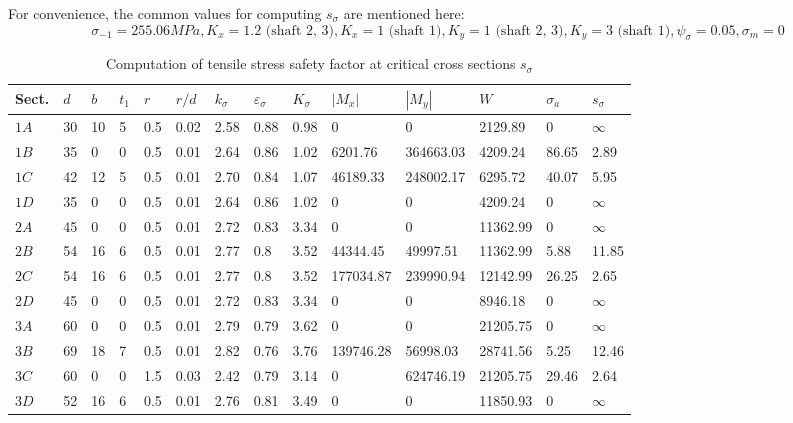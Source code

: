 \begin{landscape}
	For convenience, the common values for computing $ s_\sigma $ are mentioned here:
	\[
	\sigma_{-1} = 255.06 \unit{MPa}, K_x = 1.2 \text{ (shaft 2, 3)}, K_x = 1 \text{ (shaft 1)}, K_y = 1 \text{ (shaft 2, 3)}, K_y = 3 \text{ (shaft 1)}, \psi_\sigma = 0.05, \sigma_m = 0
	\]
	\begin{table}[ht]
		\renewcommand{\arraystretch}{1.5}
		\centering
		\caption{Computation of tensile stress safety factor at critical cross sections $ s_\sigma $}
		\begin{tabular}{llllllllllllll}\toprule
			Sect. 	& $ d $ & $ b $ & $ t_1 $ & $ r $ & $ r/d $ & $ k_\sigma $ & $ \varepsilon_\sigma $ & $ K_\sigma $ & $ |M_x| $ & $ |M_y| $ & $ W $ & $ \sigma_a $ & $ s_\sigma $ \\ \midrule
			$ 1A $	&	30	&	10	&	5	&	0.5 &  0.02	&	2.58	&	0.88	&	0.98	&	0			&	0			&	2129.89		&	0			&	 $ \infty $	\\
			$ 1B $	&	35	&	0	&	0	&	0.5 &  0.01	&	2.64	&	0.86	&	1.02	&	6201.76		&	364663.03	&	4209.24		&	86.65		&	2.89		\\
			$ 1C $	&	42	&	12	&	5	&	0.5 &  0.01	&	2.70	&	0.84	&	1.07	&	46189.33	&	248002.17	&	6295.72		&	40.07		&	5.95		\\
			$ 1D $	&	35	&	0	&	0	&	0.5 &  0.01	&	2.64	&	0.86	&	1.02	&	0			&	0			&	4209.24		&	0			&	$ \infty $	\\
			$ 2A $	&	45	&	0	&	0	&	0.5 &  0.01	&	2.72	&	0.83	&	3.34	&	0			&	0			&	11362.99	&	0			&	$ \infty $	\\
			$ 2B $	&	54	&	16	&	6	&	0.5 &  0.01	&	2.77	&	0.8	    &	3.52	&	44344.45	&	49997.51	&	11362.99	&	5.88		&	11.85		\\
			$ 2C $	&	54	&	16	&	6	&	0.5 &  0.01	&	2.77	&	0.8	    &	3.52	&	177034.87	&	239990.94	&	12142.99	&	26.25		&	2.65		\\
			$ 2D $	&	45	&	0	&	0	&	0.5 &  0.01	&	2.72	&	0.83	&	3.34	&	0			&	0			&	8946.18		&	0			&	$ \infty $	\\
			$ 3A $	&	60	&	0	&	0	&	0.5 &  0.01	&	2.79	&	0.79	&	3.62	&	0			&	0			&	21205.75	&	0			&	$ \infty $	\\
			$ 3B $	&	69	&	18	&	7	&	0.5 &  0.01	&	2.82	&	0.76	&	3.76	&	139746.28	&	56998.03	&	28741.56	&	5.25		&	12.46		\\
			$ 3C $	&	60	&	0	&	0	&	1.5 &  0.03	&	2.42	&	0.79	&	3.14	&	0			&	624746.19	&	21205.75	&	29.46		&	2.64		\\
			$ 3D $	&	52	&	16	&	6	&	0.5 &  0.01	&	2.76	&	0.81	&	3.49	&	0			&	0			&	11850.93	&	0			&	$ \infty $	\\
			\bottomrule
		\end{tabular}
		\label{safety-sigma}
	\end{table}
\end{landscape}

